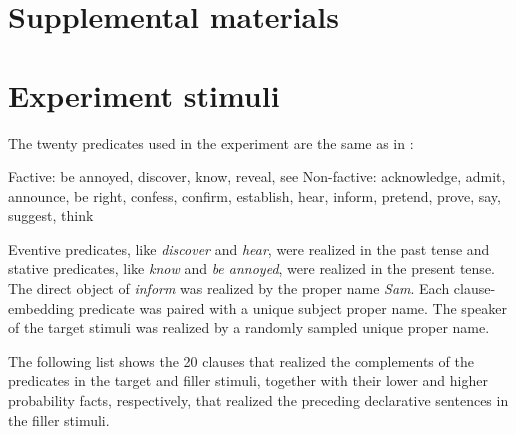 \documentclass[11pt,fleqn]{article}
\newcommand{\6}{\mbox{$[\hspace*{-.6mm}[$}}
\newcommand{\9}{\mbox{$]\hspace*{-.6mm}]$}}
\begin{document}


%


\newpage

\section*{Supplemental materials}

\appendix

\setcounter{page}{1}

\setcounter{table}{0}
\renewcommand{\thetable}{A\arabic{table}}

\setcounter{figure}{0}
\renewcommand{\thefigure}{A\arabic{figure}}

\section{Experiment stimuli}\label{a:clauses}

The twenty predicates used in the experiment are the same as in \citealt{degen-tonhauser-openmind,degen-tonhauser-language}:

\begin{exe}
\ex\label{predicates}
\begin{xlist}
\ex Factive: be annoyed, discover, know, reveal, see
\ex Non-factive: acknowledge, admit, announce, be right, confess, confirm, establish, hear, inform, pretend, prove, say, suggest, think
\end{xlist}
\end{exe}

Eventive predicates, like {\em discover} and {\em hear}, were realized in the past tense and stative predicates, like {\em know} and {\em be annoyed}, were realized in the present tense. The direct object of {\em inform} was realized by the proper name {\em Sam}. Each clause-embedding predicate was paired with a unique subject proper name. The speaker of the target stimuli was realized by a randomly sampled unique proper name. 

The following list shows the 20 clauses that realized the complements of the predicates in the target and filler stimuli, together with their lower and higher probability facts, respectively, that realized the preceding declarative sentences in the filler stimuli.
\end{document}
